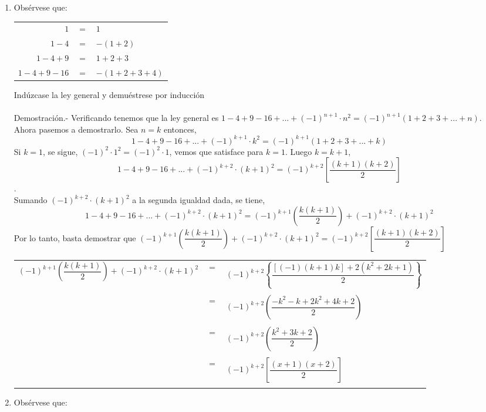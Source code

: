 \begin{enumerate}[\bfseries  1.]
\item Obsérvese que: 
\begin{center}
\begin{tabular}{r c l}
$1$&$=$&$1$\\
$1-4$&$=$&$-(1+2)$\\
$1-4+9$&$=$&$1+2+3$\\
$1-4+9-16$&$=$&$-(1+2+3+4)$\\
\end{tabular}
\end{center}
Indúzcase la ley general y demuéstrese por inducción\\\\
Demostración.- \: Verificando tenemos que la ley general es $1-4+9-16+...+(-1)^{n+1}\cdot n^2=(-1)^{n+1}(1+2+3+...+n)$. \\
Ahora pasemos a demostrarlo. Sea $n=k$ entonces, $$1-4+9-16+...+(-1)^{k+1}\cdot k^2=(-1)^{k+1}(1+2+3+...+k)$$ Si $k=1$, se sigue, $(-1)^2 \cdot 1^2 = (-1)^2\cdot 1$, vemos que satisface para $k=1.$
Luego $k=k+1$,  $$1-4+9-16+...+(-1)^{k+2}\cdot (k+1)^2=(-1)^{k+2}\left[\dfrac{(k+1)(k+2)}{2}\right]$$.\\
Sumando $(-1)^{k+2}\cdot (k+1)^2$  a la segunda igualdad dada, se tiene,
$$1-4+9-16+...+ (-1)^{k+2}\cdot (k+1)^2 = (-1)^{k+1}\left(\dfrac{k(k+1)}{2}\right) + (-1)^{k+2}\cdot (k+1)^2$$ Por lo tanto, basta demostrar que $(-1)^{k+1}\left(\dfrac{k(k+1)}{2}\right) + (-1)^{k+2}\cdot (k+1)^2=(-1)^{k+2}\left[\dfrac{(k+1)(k+2)}{2}\right]$\\
\begin{center}
\begin{tabular}{r c l}
$(-1)^{k+1}\left(\dfrac{k(k+1)}{2}\right) + (-1)^{k+2}\cdot (k+1)^2$&$=$&$(-1)^{k+2}\left\lbrace \dfrac{[(-1)(k+1)k]+2(k^2+2k+1)}{2} \right\rbrace$\\\\
&$=$&$(-1)^{k+2} \left( \dfrac{-k^2 -k +2k^2 +4k +2}{2} \right)$\\\\
&$=$&$(-1)^{k+2} \left( \dfrac{k^2+3k+2}{2} \right)$\\\\
&$=$&$(-1)^{k+2} \left[ \dfrac{(x+1)(x+2)}{2} \right]$\\\\
\end{tabular}
\end{center}
\item Obsérvese que: 

\end{enumerate}

